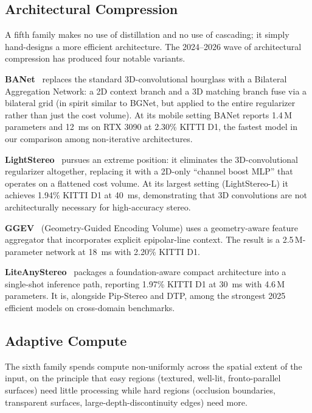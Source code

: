 \subsection{Architectural Compression}
\label{ssec:arch}

A fifth family makes no use of distillation and no use of cascading; it simply hand-designs a more efficient architecture. The 2024--2026 wave of architectural compression has produced four notable variants.

\textbf{BANet}~\cite{xu2025banet} replaces the standard 3D-convolutional hourglass with a Bilateral Aggregation Network: a 2D context branch and a 3D matching branch fuse via a bilateral grid (in spirit similar to BGNet, but applied to the entire regularizer rather than just the cost volume). At its mobile setting BANet reports 1.4\,M parameters and 12~ms on RTX 3090 at 2.30\% KITTI D1, the fastest model in our comparison among non-iterative architectures.

\textbf{LightStereo}~\cite{guo2025lightstereo} pursues an extreme position: it eliminates the 3D-convolutional regularizer altogether, replacing it with a 2D-only ``channel boost MLP'' that operates on a flattened cost volume. At its largest setting (LightStereo-L) it achieves 1.94\% KITTI D1 at 40~ms, demonstrating that 3D convolutions are not architecturally necessary for high-accuracy stereo.

\textbf{GGEV}~\cite{liu2026ggev} (Geometry-Guided Encoding Volume) uses a geometry-aware feature aggregator that incorporates explicit epipolar-line context. The result is a 2.5\,M-parameter network at 18~ms with 2.20\% KITTI D1.

\textbf{LiteAnyStereo}~\cite{jing2025liteanystereo} packages a foundation-aware compact architecture into a single-shot inference path, reporting 1.97\% KITTI D1 at 30~ms with 4.6\,M parameters. It is, alongside Pip-Stereo and DTP, among the strongest 2025 efficient models on cross-domain benchmarks.

\subsection{Adaptive Compute}
\label{ssec:adaptive}

The sixth family spends compute non-uniformly across the spatial extent of the input, on the principle that easy regions (textured, well-lit, fronto-parallel surfaces) need little processing while hard regions (occlusion boundaries, transparent surfaces, large-depth-discontinuity edges) need more.

